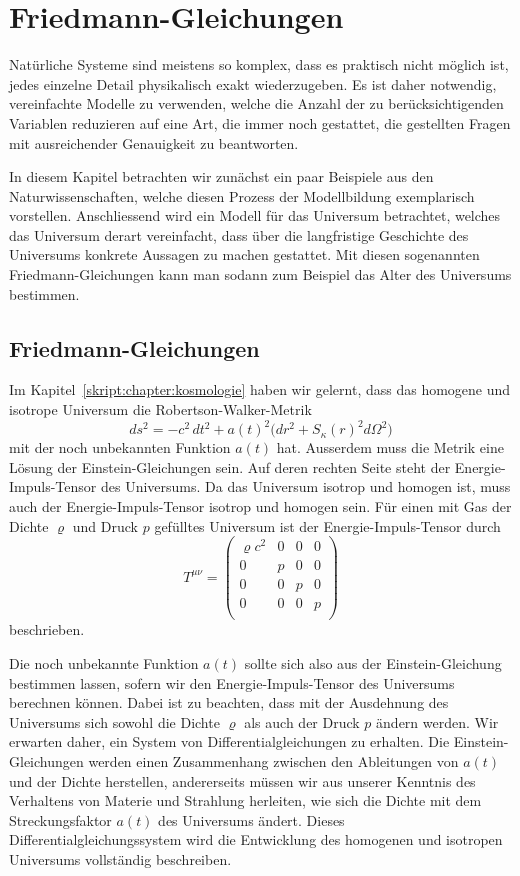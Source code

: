 %
%
%
\chapter{Friedmann-Gleichungen%
\label{skript:chapter:friedmann}}
\rhead{}
Natürliche Systeme sind meistens so komplex, dass es praktisch nicht
möglich ist, jedes einzelne Detail physikalisch exakt wiederzugeben.
Es ist daher notwendig, vereinfachte Modelle zu verwenden, welche 
die Anzahl der zu berücksichtigenden Variablen reduzieren auf eine
Art, die immer noch gestattet, die gestellten Fragen mit ausreichender
Genauigkeit zu beantworten.

In diesem Kapitel betrachten wir zunächst ein paar Beispiele aus den
Naturwissenschaften, welche diesen Prozess der Modellbildung exemplarisch
vorstellen.
Anschliessend wird ein Modell für das Universum betrachtet, welches
das Universum derart vereinfacht, dass über die langfristige
Geschichte des Universums konkrete Aussagen zu machen gestattet.
Mit diesen sogenannten Friedmann-Gleichungen kann man sodann zum
Beispiel das Alter des Universums bestimmen.

\section{Friedmann-Gleichungen}
Im Kapitel~\ref{skript:chapter:kosmologie} haben wir gelernt, dass
das homogene und isotrope Universum die Robertson-Walker-Metrik 
\[
ds^2
=
-c^2\,dt^2
+
a(t)^2\bigl(
dr^2 + S_\kappa(r)^2d\Omega^2
\bigr)
\]
mit der noch unbekannten Funktion $a(t)$ hat.
Ausserdem muss die Metrik eine Lösung der Einstein-Gleichungen sein.
Auf deren rechten Seite steht der Energie-Impuls-Tensor des Universums.
Da das Universum isotrop und homogen ist, muss auch der Energie-Impuls-Tensor
isotrop und homogen sein.
Für einen mit Gas der Dichte $\varrho$ und Druck $p$ gefülltes Universum
ist der Energie-Impuls-Tensor durch
\[
T^{\mu\nu}
=
\begin{pmatrix}
\varrho c^2 & 0 & 0 & 0 \\
     0      & p & 0 & 0 \\
     0      & 0 & p & 0 \\
     0      & 0 & 0 & p \\
\end{pmatrix}
\]
beschrieben.

Die noch unbekannte Funktion $a(t)$ sollte sich also aus der
Einstein-Gleichung bestimmen lassen, sofern wir den Energie-Impuls-Tensor
des Universums berechnen können.
Dabei ist zu beachten, dass mit der Ausdehnung des Universums sich sowohl
die Dichte $\varrho$ als auch der Druck $p$ ändern werden.
Wir erwarten daher, ein System von Differentialgleichungen zu erhalten.
Die Einstein-Gleichungen werden einen Zusammenhang zwischen den 
Ableitungen von $a(t)$ und der Dichte herstellen,
andererseits müssen wir aus unserer Kenntnis des Verhaltens von
Materie und Strahlung herleiten, wie sich die Dichte mit dem
Streckungsfaktor  $a(t)$ des Universums ändert.
Dieses Differentialgleichungssystem wird die Entwicklung des homogenen
und isotropen Universums vollständig beschreiben.

